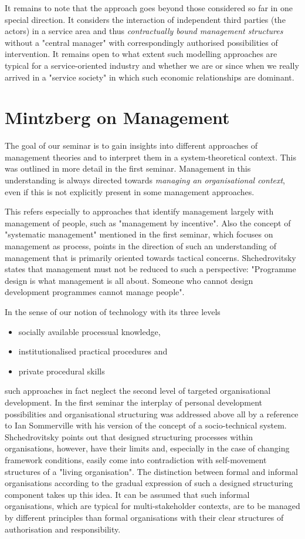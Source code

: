 \documentclass[11pt,a4paper]{article}
\begin{document}
It remains to note that the approach goes beyond those considered so far in
one special direction. It considers the interaction of independent third
parties (the actors) in a service area and thus \emph{contractually bound
  management structures} without a "central manager" with correspondingly
authorised possibilities of intervention. It remains open to what extent such
modelling approaches are typical for a service-oriented industry and whether
we are or since when we really arrived in a "service society" in which such
economic relationships are dominant.

\section{Mintzberg on Management}

The goal of our seminar is to gain insights into different approaches of
management theories and to interpret them in a system-theoretical context.
This was outlined in more detail in the first seminar. Management in this
understanding is always directed towards \emph{managing an organisational
  context}, even if this is not explicitly present in some management
approaches.

This refers especially to approaches that identify management largely with
management of people, such as "management by incentive". Also the concept of
"systematic management" \cite{Hill2015} mentioned in the first seminar, which
focuses on management as process, points in the direction of such an
understanding of management that is primarily oriented towards tactical
concerns.  Shchedrovitsky \cite[p. 66]{MSM} states that management must not be
reduced to such a perspective: "Programme design is what management is all
about. Someone who cannot design development programmes cannot manage people".

In the sense of our notion of technology with its three levels
\begin{itemize}
\item socially available processual knowledge,
\item institutionalised practical procedures and 
\item private procedural skills
\end{itemize}
such approaches in fact neglect the second level of targeted organisational
development. In the first seminar the interplay of personal development
possibilities and organisational structuring was addressed above all by a
reference to Ian Sommerville \cite[ch. 19]{Sommerville2015} with his version
of the concept of a socio-technical system. Shchedrovitsky points out that
designed structuring processes within organisations, however, have their
limits and, especially in the case of changing framework conditions, easily
come into contradiction with self-movement structures of a "living
organisation". The distinction between formal and informal organisations
according to the gradual expression of such a designed structuring component
takes up this idea. It can be assumed that such informal organisations, which
are typical for multi-stakeholder contexts, are to be managed by different
principles than formal organisations with their clear structures of
authorisation and responsibility.
\end{document}
